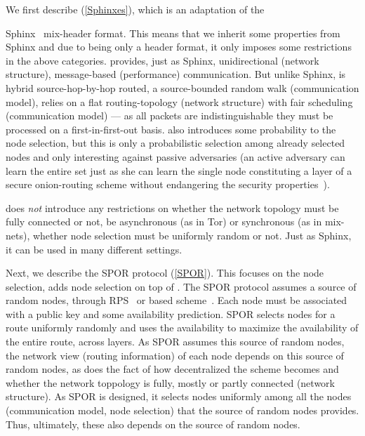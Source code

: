 We first describe \sphinxes (\cref{Sphinxes}), which is an adaptation of the 


Sphinx~\cite{Sphinx} mix-header format.
This means that we inherit some properties from Sphinx and due to being only a 
header format, it only imposes some restrictions in the above categories.
\Sphinxes provides, just as Sphinx, unidirectional (network structure), 
message-based (performance) communication.
But unlike Sphinx, \Sphinxes is hybrid source-hop-by-hop routed, a
source-bounded random walk (communication 
model),
\Sphinxes relies on a flat routing-topology (network structure) with fair 
scheduling (communication model) --- as all packets are indistinguishable they 
must be processed on a first-in-first-out basis.
\Sphinxes also introduces some probability to the node selection, but this is 
only a probabilistic selection among already selected nodes and only 
interesting against passive adversaries (an active adversary can learn the 
entire set just as she can learn the single node constituting a layer of a
secure onion-routing scheme without endangering the security
properties~\cite{CLOnionRouting}).

\Sphinxes does \emph{not} introduce any restrictions on whether the network 
topology must be fully connected or not, be asynchronous (as in Tor) or 
synchronous (as in mix-nets), whether node selection must be uniformly random 
or not.
Just as Sphinx, it can be used in many different settings.

Next, we describe the \ac{SPOR} protocol (\cref{SPOR}).
This focuses on the node selection, \ie adds node selection on top of \Sphinxes.
The \ac{SPOR} protocol assumes a source of random nodes, \eg through 
\ac{RPS}~\cite[\eg][]{BrahmsRPS} or  based 
scheme~\cite[\eg][]{Octopus}.
Each node must be associated with a public key and some availability 
prediction.
\Ac{SPOR} selects nodes for a route uniformly randomly and uses the 
availability to maximize the availability of the entire route, \ie across 
layers.
As \ac{SPOR} assumes this source of random nodes, the network view (routing 
information) of each node depends on this source of random nodes, as does the 
fact of how decentralized the scheme becomes and whether the network toppology 
is fully, mostly or partly connected (network structure).
As \ac{SPOR} is designed, it selects nodes uniformly among all the nodes 
(communication model, node selection) that the source of random nodes provides.
Thus, ultimately, these also depends on the source of random nodes.

